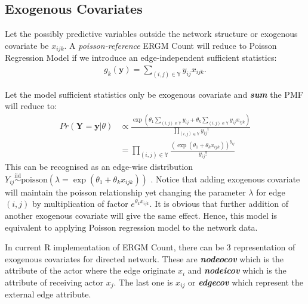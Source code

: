 \documentclass[12pt,a4paper,twoside,openany]{book}\usepackage[]{graphicx}\usepackage[]{color}
\newcommand{\BI}[1]{\textit{\textbf{#1}}}
\begin{document}
\subsection{Exogenous Covariates}
Let the possibly predictive variables outside the network structure or exogenous covariate be $x_{ijk}$.
A \textit{poisson-reference} ERGM Count will reduce to Poisson Regression Model if we introduce an edge-independent sufficient statistics:
\begin{align}
g_k(\bm{y})= \sum_{(i,j) \in \mathbb{Y}} y_{ij}x_{ijk}.
\end{align}

Let the model sufficient statistics only be exogenous covariate and \BI{sum}  the PMF will reduce to:
\begin{align*}
Pr(\bm{Y}=\bm{y}|\theta) &\propto \frac{\exp\left(\theta_1 \sum_{(i,j) \in \mathbb{Y}} y_{ij} + \theta_k \sum_{(i,j) \in \mathbb{Y}} y_{ij}x_{ijk} \right)}{\prod_{(i,j) \in \mathbb{Y}}y_{ij}!} \\
&= \prod_{(i,j) \in \mathbb{Y}} \frac{(\exp(\theta_1+\theta_k x_{ijk}))^{y_{ij}}}{y_{ij}!}
\end{align*}
This can be recognised as an edge-wise distribution $Y_{ij}\stackrel{\text{iid}}{\sim}\text{poisson}(\lambda =\exp(\theta_1 + \theta_k x_{ijk} ))$ .
Notice that adding exogenous covariate will maintain the poisson relationship yet changing the parameter $\lambda$ for edge $(i,j)$ by multiplication of factor $e^{\theta_k x_{ijk}}$.
It is obvious that further addition of another exogenous covariate will give the same effect.
Hence, this model is equivalent to applying Poisson regression model to the network data.  

In current R implementation of ERGM Count, there can be 3 representation of exogenous covariates for directed network. 
These are \BI{nodeocov} which is the attribute of the actor where the edge originate $x_{i}$ and \BI{nodeicov} which is the attribute of receiving actor $x_j$. 
The last one is $x_{ij}$ or \BI{edgecov} which represent the external edge attribute.
\end{document}
